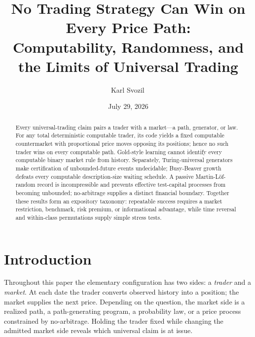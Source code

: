 \documentclass[aps,pra,reprint,superscriptaddress,amsmath,amssymb,floatfix]{revtex4-2}
\theoremstyle{plain}
\theoremstyle{definition}
\theoremstyle{remark}
\begin{document}
\title{No Trading Strategy Can Win on Every Price Path:\\
Computability, Randomness, and the Limits of Universal Trading}

\author{Karl Svozil\,}

\date{July 29, 2026}

\begin{abstract}
Every universal-trading claim pairs a trader with a market---a path, generator,
or law. For any total deterministic computable trader, its code yields a fixed
computable countermarket with proportional price moves opposing its positions;
hence no such trader wins on every computable path. Gold-style learning cannot
identify every computable binary market rule from history. Separately,
Turing-universal generators make certification of unbounded-future events
undecidable; Busy-Beaver growth defeats every computable description-size
waiting schedule. A passive Martin-L\"of-random record is incompressible and
prevents effective test-capital processes from becoming unbounded;
no-arbitrage supplies a distinct financial boundary. Together these results
form an expository taxonomy: repeatable success requires a market restriction,
benchmark, risk premium, or informational advantage, while time reversal and
within-class permutations supply simple stress tests.
\end{abstract}

\maketitle

\section{Introduction}
\label{sec:intro}

Throughout this paper the elementary configuration has two sides: a
\emph{trader} and a \emph{market}. At each date the trader converts observed
history into a position; the market supplies the next price. Depending on the
question, the market side is a realized path, a path-generating program, a
probability law, or a price process constrained by no-arbitrage. Holding the
trader fixed while changing the admitted market side reveals which universal
claim is at issue.
\end{document}
